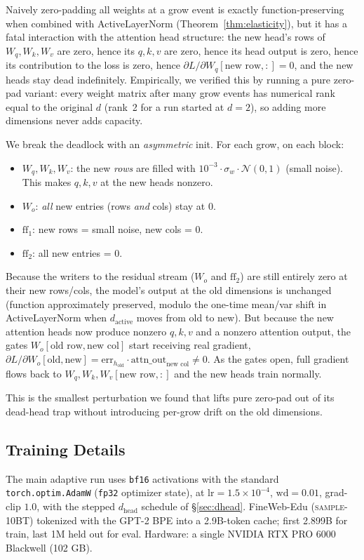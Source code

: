 \documentclass{article}
\begin{document}
Naively zero-padding all weights at a grow event is exactly
function-preserving when combined with ActiveLayerNorm
(Theorem~\ref{thm:elasticity}), but it has a fatal interaction with the
attention head structure: the new head's rows of $W_q, W_k, W_v$ are zero,
hence its $q,k,v$ are zero, hence its head output is zero, hence its
contribution to the loss is zero, hence $\partial L / \partial W_q[\text{new
row},:] = 0$, and the new heads stay dead indefinitely.  Empirically, we
verified this by running a pure zero-pad variant: every weight matrix
after many grow events has numerical rank equal to the original $d$
(rank~2 for a run started at $d=2$), so adding more dimensions never adds
capacity.

We break the deadlock with an \emph{asymmetric} init.  For each grow, on
each block:
\begin{itemize}
\item $W_q, W_k, W_v$: the new \emph{rows} are filled with
  $10^{-3} \cdot \sigma_w \cdot \mathcal{N}(0,1)$ (small noise).  This makes
  $q, k, v$ at the new heads nonzero.
\item $W_o$: \emph{all} new entries (rows \emph{and} cols) stay at $0$.
\item $\mathrm{ff}_1$: new rows = small noise, new cols = $0$.
\item $\mathrm{ff}_2$: all new entries = $0$.
\end{itemize}
Because the writers to the residual stream ($W_o$ and $\mathrm{ff}_2$) are
still entirely zero at their new rows/cols, the model's output at the old
dimensions is unchanged (function approximately preserved, modulo the
one-time mean/var shift in ActiveLayerNorm when $d_{\text{active}}$ moves
from old to new).  But because the new attention heads now produce nonzero
$q,k,v$ and a nonzero attention output, the gates
$W_o[\text{old row},\text{new col}]$ start receiving real gradient,
$\partial L / \partial W_o[\text{old},\text{new}] = \text{err}_{h_{\text{old}}}
\cdot \text{attn\_out}_{\text{new col}} \neq 0$.  As the gates open, full
gradient flows back to $W_q,W_k,W_v[\text{new row},:]$ and the new heads
train normally.

This is the smallest perturbation we found that lifts pure zero-pad out of
its dead-head trap without introducing per-grow drift on the old dimensions.

\subsection{Training Details}
The main adaptive run uses \texttt{bf16} activations with the standard
\texttt{torch.optim.AdamW} (\texttt{fp32} optimizer state), at
$\mathrm{lr}=1.5{\times}10^{-4}$, $\mathrm{wd}=0.01$, grad-clip $1.0$,
with the stepped $d_{\text{head}}$ schedule of \S\ref{sec:dhead}.
FineWeb-Edu (\textsc{sample-10BT}) tokenized with the GPT-2 BPE into a
2.9B-token cache; first 2.899B for train, last 1M held out for eval.
Hardware: a single NVIDIA RTX PRO 6000 Blackwell (102 GB).
\end{document}
